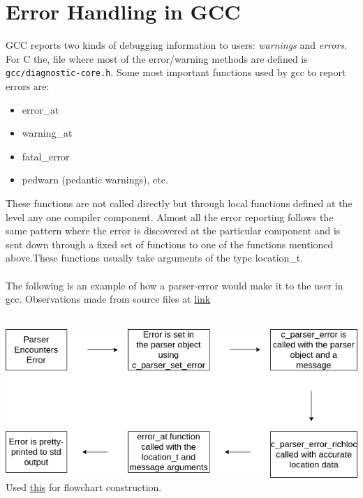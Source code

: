 \documentclass[12pt]{article}
\begin{document}
\section*{Error Handling in GCC}
GCC reports two kinds of debugging information to users: \textit{warnings} and \textit{errors}.\\
For C the, file where most of the error/warning methods are defined is \texttt{gcc/diagnostic-core.h}. Some most important functions used by gcc to report errors are:
\begin{itemize}
\item error\_at
\item warning\_at
\item fatal\_error
\item pedwarn (pedantic warnings), etc.
\end{itemize}
These functions are not called directly but through local functions defined at the level any one compiler component. Almost all the error reporting follows the same pattern where the error is discovered at the particular component and is sent down through a fixed set of functions to one of the functions mentioned above.These functions usually take arguments of the type location\_t.\\\\ 
The following is an example of how a parser-error would make it to the user in gcc.
Observations made from source files at \href{https://github.com/gcc-mirror/gcc/tree/5fe20025f581fb0c215611434d76696161d4cbd3/gcc/c}{link} \\\\
\begin{center}
\includegraphics[scale=0.65]{gcc.png}
Used \href{https://www.draw.io}{this} for flowchart construction.
\end{center}
\end{document}
